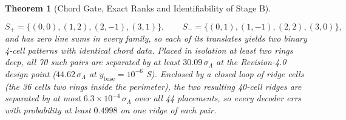 \documentclass[11pt,a4paper]{article}
\newtheorem{theorem}{Theorem}[section]
\theoremstyle{definition}
\theoremstyle{remark}
\begin{document}
\begin{theorem}[Chord Gate, Exact Ranks and Identifiability of Stage B]
\begin{enumerate}
    \begin{equation*}
    S_+ = \{(0,0),(1,2),(2,-1),(3,1)\},\qquad S_- = \{(0,1),(1,-1),(2,2),(3,0)\},
    \end{equation*}
    and has zero line sums in every family, so each of its translates yields two binary 4-cell patterns with identical chord data. Placed in isolation at least two rings deep, all 70 such pairs are separated by at least $30.09\,\sigma_\Lambda$ at the Revision-4.0 design point ($44.62\,\sigma_\Lambda$ at $y_{\text{base}} = 10^{-6}$ S). Enclosed by a closed loop of ridge cells (the 36 cells two rings inside the perimeter), the two resulting 40-cell ridges are separated by at most $6.3\times10^{-4}\,\sigma_\Lambda$ over all 44 placements, so every decoder errs with probability at least $0.4998$ on one ridge of each pair.
\end{enumerate}
\end{theorem}
\end{document}

